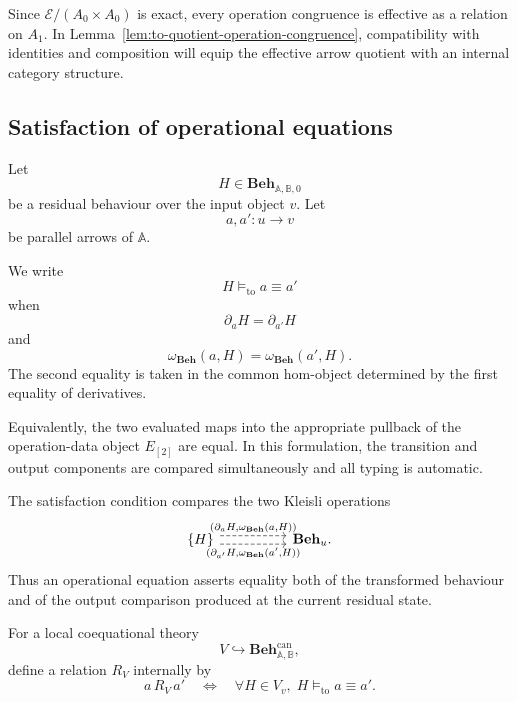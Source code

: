 Since \(\mathcal E/(A_0\times A_0)\) is exact, every operation congruence is
effective as a relation on \(A_1\). In
Lemma~\ref{lem:to-quotient-operation-congruence}, compatibility with
identities and composition will equip the effective arrow quotient with an
internal category structure.

\subsection{Satisfaction of operational equations}
\label{subsec:to-satisfaction-operational-equations}

Let
\[
    H\in
    \mathbf{Beh}_{\mathbb A,\mathbb B,0}
\]
be a residual behaviour over the input object \(v\). Let
\[
    a,a':u\to v
\]
be parallel arrows of \(\mathbb A\).

\begin{definition}
\label{def:to-transition-output-satisfaction}
    We write
    \[
        H\models_{\mathrm{to}} a\equiv a'
    \]
    when
    \[
        \partial_aH=\partial_{a'}H
    \]
    and
    \[
        \omega_{\mathbf{Beh}}(a,H)
        =
        \omega_{\mathbf{Beh}}(a',H).
    \]
    The second equality is taken in the common hom-object determined by the
    first equality of derivatives.
\end{definition}

Equivalently, the two evaluated maps into the appropriate pullback of the
operation-data object \(E_{[2]}\) are equal. In this formulation, the
transition and output components are compared simultaneously and all typing
is automatic.

The satisfaction condition compares the two Kleisli operations
\[
\begin{tikzcd}[column sep=huge]
    \{H\}
        \arrow[r, shift left=.7ex, dashed,
        "{(\partial_aH,\omega_{\mathbf{Beh}}(a,H))}"]
        \arrow[r, shift right=.7ex, dashed,
        "{(\partial_{a'}H,\omega_{\mathbf{Beh}}(a',H))}"']
    &
    \mathbf{Beh}_u.
\end{tikzcd}
\]
Thus an operational equation asserts equality both of the transformed
behaviour and of the output comparison produced at the current residual state.

For a local coequational theory
\[
    V\hookrightarrow
    \mathbf{Beh}^{\mathrm{can}}_{\mathbb A,\mathbb B},
\]
define a relation \(R_V\) internally by
\[
    a\,R_V\,a'
    \quad\Longleftrightarrow\quad
    \forall H\in V_v,\;
    H\models_{\mathrm{to}}a\equiv a'.
\]

